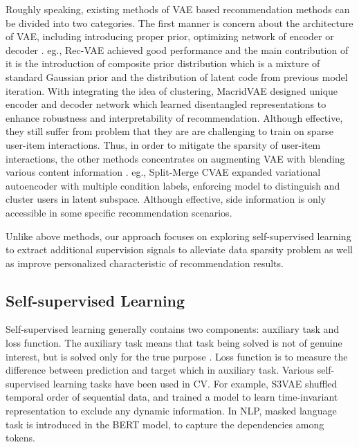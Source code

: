 Roughly speaking, existing methods of VAE based recommendation methods can be divided into two categories. The first manner is concern about the architecture of VAE, including introducing proper prior, optimizing network of encoder or decoder \cite{DBLP:conf/recsys/LiuWJY19, DBLP:conf/www/LiuJWWSWXY20, DBLP:conf/iclr/LobelLGC20, DBLP:conf/nips/MaZ0Y019, DBLP:conf/wsdm/ShenbinATMN20,  DBLP:conf/wsdm/TruongSL21}. eg., Rec-VAE \cite{DBLP:conf/wsdm/ShenbinATMN20} achieved good performance and the main contribution of it is the introduction of
composite prior distribution which is a mixture of standard Gaussian prior and the distribution of latent code from previous model iteration. With integrating the idea of clustering, MacridVAE \cite{DBLP:conf/nips/MaZ0Y019} designed unique encoder and decoder network which learned disentangled representations to enhance robustness and interpretability of  recommendation. Although effective, they still suffer from problem that they are are challenging to train on sparse user-item interactions. Thus, in order to mitigate the
sparsity of user-item interactions, the other methods concentrates on augmenting VAE with blending various content information \cite{DBLP:journals/corr/abs-1808-01006,DBLP:conf/cikm/LeeSM17, DBLP:conf/pakdd/PangYW19, DBLP:conf/wsdm/RakeshWSL19, DBLP:conf/ictir/WuMO20, DBLP:conf/recsys/ZhangZHC20}. eg., Split-Merge CVAE \cite{DBLP:conf/pakdd/PangYW19} expanded variational autoencoder with multiple condition labels, enforcing model to distinguish and cluster users in latent subspace. Although effective, side information is only accessible in some specific recommendation scenarios.

Unlike above methods, our approach focuses on exploring self-supervised learning to extract additional supervision signals to alleviate data sparsity problem as well as improve personalized characteristic of recommendation  results.

\subsection{Self-supervised Learning }\label{subsec2}

Self-supervised learning generally contains two components: auxiliary task  and loss function. The auxiliary task means that task being solved is not of genuine interest, but is solved only for the true purpose \cite{DBLP:conf/cvpr/He0WXG20}. Loss function is to measure the difference between prediction and target which in auxiliary task. Various self-supervised learning tasks have been used in CV. For example, S3VAE \cite{DBLP:conf/cvpr/ZhuMKG20} shuffled temporal order of sequential data, and trained a model to learn time-invariant representation to exclude any dynamic information. In NLP, masked language task is introduced in the BERT \cite{DBLP:conf/naacl/DevlinCLT19} model, to capture the dependencies among tokens.

